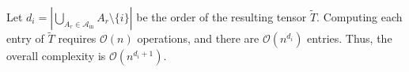 \documentclass[letterpaper,11pt]{article}
\newcommand{\mytensorspace}{\mathbb{T}}
\newcommand{\myindexspace}{\mathbb{I}}
\newcommand{\sumonverindex}[2]{\operatorname{S}[#1](#2)}
\begin{document}
\begin{remark}
Let $d_i = \left| \bigcup_{A_r \in \mathcal{A}_{\mathrm{in}}} A_r \setminus \{i\} \right|$ be the order of the resulting tensor $\widetilde{T}$. Computing each entry of $\widetilde{T}$ requires $\mathcal{O}(n)$ operations, and there are $\mathcal{O}(n^{d_i})$ entries. Thus, the overall complexity is $\mathcal{O}(n^{d_i + 1})$.
\end{remark}



  
  
  

\end{document}
